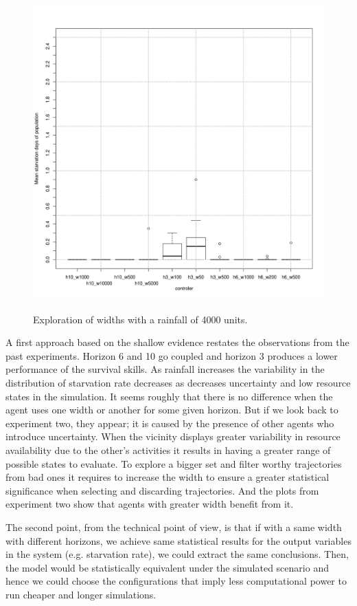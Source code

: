 \documentclass[11pt,oneside,a4paper,openright]{report}
\begin{document}
\begin{figure}[!htb]
\centering
\includegraphics[height=12.2cm]{figures/expm/ecsi3_clim4000}
\caption{Exploration of widths with a rainfall of 4000 units.}
\label{fig:ecsi3_clim4000}
\end{figure}


A first approach based on the shallow evidence restates the observations from the past experiments. Horizon 6 and 10 go coupled and horizon 3 produces a lower performance of the survival skills. As rainfall increases the variability in the distribution of starvation rate decreases as decreases uncertainty and low resource states in the simulation.
It seems roughly that there is no difference when the agent uses one width or another for some given horizon. But if we look back to experiment two, they appear; it is caused by the presence of other agents who introduce uncertainty. 
When the vicinity displays greater variability in resource availability  due to the other's activities it results in having a greater range of possible states to evaluate. To explore a bigger set and filter worthy trajectories from bad ones it requires to increase the width to ensure a greater statistical significance when selecting and discarding trajectories. 
And the plots from experiment two show that agents with greater width benefit from it.

The second point, from the technical point of view, is that if with a same width with different horizons, we achieve same statistical results for the output variables in the system (e.g. starvation rate), we could extract the same conclusions. Then, the model would be statistically equivalent  under the simulated scenario and hence we could choose the configurations that imply less computational power to run cheaper and longer simulations.
\end{document}

